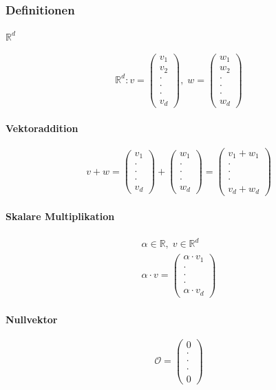 \documentclass[12pt,a4paper]{article}%
\numberwithin{equation}{section}
\newcommand{\R}{\mathbb{R}} %
\newcommand{\subsubsubsection}{\paragraph}
\def\vecT#1{\left(\begin{array}{c} #1 \end{array}\right)}
\def\dddot{\cdot \\ \cdot \\ \cdot}
\def\vecD#1{\vecT{#1_1 \\ \dddot \\ #1_d}}
\numberwithin{equation}{subsection}
\begin{document}
		\subsubsection{Definitionen}
		\subsubsubsection{$\R^d$}
		\begin{equation}
			\R^d: v = \vecT{v_1\\v_2\\ \dddot \\v_d},\; w = \vecT{w_1\\w_2\\ \dddot \\ w_d}
		\end{equation}	
		\subsubsubsection{Vektoraddition}
		\begin{equation}
			v + w = \vecD{v} + \vecD{w} = \vecT{v_1 + w_1 \\ \dddot \\ v_d + w_d}
		\end{equation}
		\subsubsubsection{Skalare Multiplikation}
		\begin{align}
			\alpha \in \R, \; v \in \R^d \nonumber \\
			\alpha \cdot v = \vecD{\alpha\cdot v}
		\end{align}
		\subsubsubsection{Nullvektor}
		\begin{equation}
		  \mathcal{O} = \vecT{0 \\ \dddot \\ 0}
    \end{equation}		
    
\end{document}
